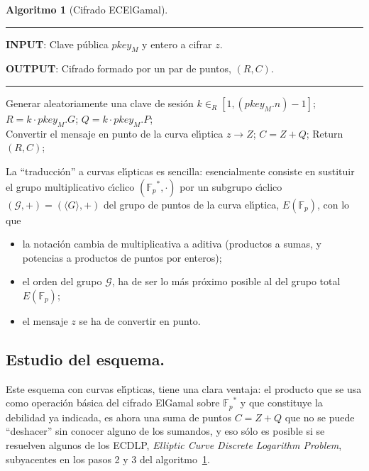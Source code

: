 \documentclass{cedi}%
\def\ce{curva{} el\'{\i}ptica}%
\def\ces{curvas{} el\'{\i}pticas}%
\newcommand{\Fp}{\ensuremath{\mathbb{F}_p}}%
\theoremstyle{plain}        			%
\theoremstyle{definition}   			%
\theoremstyle{saltolinea}   			%
\newtheorem{algo}{Algoritmo}
\begin{document}
\begin{algo}[Cifrado ECElGamal]\label{alg:ECElGamal}
\parbox[b]{\linewidth}{%
\hrule
\smallskip
{\bf INPUT}: Clave p\'ublica $pkey_{M}$ y entero a cifrar $z$.

{\bf OUTPUT}: Cifrado formado por un par de puntos, $(R,C)$.
\vspace{1.5mm}
\hrule
}%
\begin{algorithmic}[1]
\STATE Generar aleatoriamente una clave de sesi\'on $k\in_{R}\left[1,\left(pkey_{M}.n\right)-1\right]$;
\STATE $R=k\cdot pkey_{M}.G$;
\STATE $Q=k\cdot pkey_{M}.P$; \\
\STATE Convertir el mensaje en punto de la \ce{} $z\rightarrow Z$;
\STATE $C=Z+Q$;
\STATE Return $(R,C)$;
\end{algorithmic}
\end{algo}

La ``traducci\'on'' a \ces{} es sencilla: esencialmente consiste en sustituir el grupo multiplicativo c\'{\i}clico $(\Fp^*,\cdot)$ por un subgrupo c\'{\i}clico $(\mathcal{G},+)=(\langle G\rangle,+)$ del grupo de puntos de la \ce{}, $E(\Fp)$, con lo que
\begin{itemize}
	\item la notaci\'on cambia de multiplicativa a aditiva (productos a sumas, y potencias a productos de puntos por enteros);
	\item el orden del grupo $\mathcal{G}$, ha de ser lo m\'as pr\'oximo posible al del grupo total $E(\Fp)$;
	\item el mensaje $z$ se ha de convertir en punto.
\end{itemize}


\subsection*{Estudio del esquema.}

Este esquema con \ces{}, tiene una clara ventaja: el producto que se usa como operaci\'on b\'asica del cifrado ElGamal sobre $\Fp^*$ y que constituye la debilidad ya indicada, es ahora una suma de puntos $C=Z+Q$ que no se puede ``deshacer'' sin conocer alguno de los sumandos, y eso s\'olo es posible si se resuelven algunos de los ECDLP, \emph{Elliptic Curve Discrete Logarithm Problem}, subyacentes en los pasos 2 y 3 del algoritmo~\ref{alg:ECElGamal}.
\end{document}
